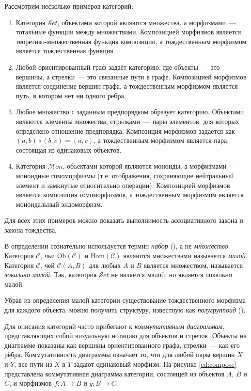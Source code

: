 Рассмотрим несколько примеров категорий:
\begin{enumerate}
  \item Категория $\mathcal{S}et$, объектами которой являются множества, а морфизмами~--- тотальные функции между множествами. Композицией морфизмов является теоретико-множественная функция композиции, а тождественным морфизмом является тождественная функция.
  \item Любой ориентированный граф задаёт категорию, где объекты~--- это вершины, а стрелки~--- это связанные пути в графе. Композицией морфизмов является соединение вершин графа, а тождественным морфизмом является путь, в котором нет ни одного ребра.
  \item Любое множество с заданным предпорядком образует категорию. Объектами являются элементы множества, стрелками~--- пары элементов, для которых определено отношение предпорядка. Композиция морфизмов задаётся как $(a, b) \circ (b, c) = (a, c)$, а тождественным морфизмом является пара, состоящая из одинаковых объектов.
  \item Категория $\mathcal{M}on$, объектами которой являются моноиды, а морфизмами~--- моноидные гомоморфизмы (т.е. отображения, сохраняющие нейтральный элемент и замкнутые относительно операции). Композицией морфизмов является композиция гомоморфизмов, а тождественным морфизмом является моноидальный эндоморфизм.
\end{enumerate}

Для всех этих примеров можно показать выполнимость ассоциативного закона и закона тождества.

В определении сознательно используется термин \emph{набор} (), а не \emph{множество}. Категория $\mathcal{C}$, чьи $\mathrm{Ob}(\mathcal{C})$ и $\mathrm{Hom}(\mathcal{C})$ являются множествами называется \emph{малой}. Категория $\mathcal{C}$, чей $\mathcal{C}(A, B)$ для любых $A$ и $B$ является множеством, называется \emph{локально малой}. Так, категория $\mathcal{S}et$ не является малой, но является локально малой.

Убрав из определения малой категории существование тождественного морфизма для каждого объекта, можно получить структуру, известную как \emph{полугруппоид} ().

Для описания категорий часто прибегают к \emph{коммутативным диаграммам}, представляющих собой визуальную нотацию для объектов и стрелок. Объекты на диаграмме показаны как вершины ориентированного графа, стрелки~--- как его рёбра. Коммутативность диаграммы означает то, что для любой пары вершин $X$ и $Y$, все пути из $X$ в $Y$ задают одинаковый морфизм. На рисунке \ref{cd:compose} представлена коммутативная диаграмма категории, состоящей из объектов $A$, $B$ и $C$, и морфизмов $f : A \to B$ и $g : B \to C$.

